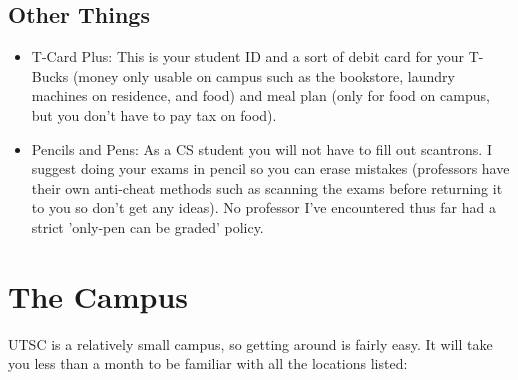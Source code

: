 \documentclass[11pt]{article}
\begin{document}
\subsection{Other Things}
\begin{itemize}
    \item T-Card Plus: This is your student ID and a sort of debit card for your T-Bucks (money only usable on campus such as the bookstore, laundry machines on residence, and food) and meal plan (only for food on campus, but you don't have to pay tax on food).
    \item Pencils and Pens: As a CS student you will not have to fill out scantrons. I suggest doing your exams in pencil so you can erase mistakes (professors have their own anti-cheat methods such as scanning the exams before returning it to you so don't get any ideas). No professor I've encountered thus far had a strict 'only-pen can be graded' policy.  
\end{itemize}

\section{The Campus}

UTSC is a relatively small campus, so getting around is fairly easy. It will take you less than a month to be familiar with all the locations listed:
\end{document}
